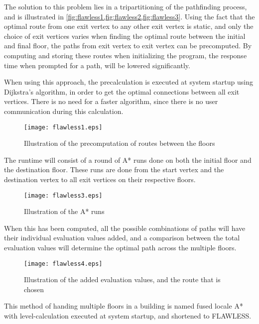 The solution to this problem lies in a tripartitioning of the pathfinding process, and is illustrated in \cref{fig:flawless1,fig:flawless2,fig:flawless3}. Using the fact that the optimal route from one exit vertex to any other exit vertex is static, and only the choice of exit vertices varies when finding the optimal route between the initial and final floor, the paths from exit vertex to exit vertex can be precomputed. By computing and storing these routes when initializing the program, the response time when prompted for a path, will be lowered significantly.

When using this approach, the precalculation is executed at system startup using Dijkstra's algorithm, in order to get the optimal connections between all exit vertices. There is no need for a faster algorithm, since there is no user communication during this calculation.

%

\begin{figure}[ht!]
    \centering
    \texttt{[image: flawless1.eps]}
    \caption{Illustration of the precomputation of routes between the floors}
    \label{fig:flawless1}
  \end{figure}

The runtime will consist of a round of A* runs done on both the initial floor and the destination floor. These runs are done from the start vertex and the destination vertex to all exit vertices on their respective floors. 

\begin{figure}[ht!]
    \centering
    \texttt{[image: flawless3.eps]}
    \caption{Illustration of the A* runs}
    \label{fig:flawless2}
  \end{figure}

When this has been computed, all the possible combinations of paths will have their individual evaluation values added, and a comparison between the total evaluation values will determine the optimal path across the multiple floors. 

\begin{figure}[ht!]
    \centering
    \texttt{[image: flawless4.eps]}
    \caption{Illustration of the added evaluation values, and the route that is chosen}
    \label{fig:flawless3}
  \end{figure}

This method of handing multiple floors in a building is named fused locale A* with level-calculation executed at system startup, and shortened to FLAWLESS.


